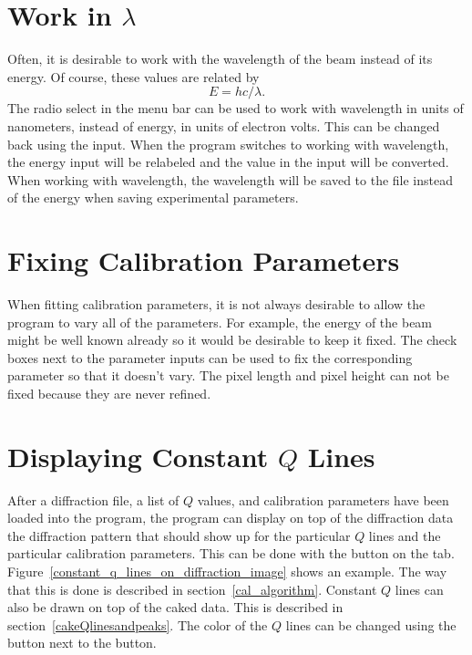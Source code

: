 \section{\texorpdfstring{Work in 
    $\lambda$}{Work in Lambda}}
    \label{workWavelength}

Often, it is desirable to work with the wavelength 
of the beam instead of its energy. Of course, these
values are related by
\begin{equation}
    E=hc/\lambda.
\end{equation}
The  radio select in the menu bar
can be used to work with wavelength in units of nanometers, 
instead of energy, in units of electron volts. 
This can be changed back using the  input.
When the program switches to working with wavelength,
the energy input  will be relabeled
\gui{$\lambda$} and the value in the input will be converted.
When working with wavelength, the 
wavelength will be saved to the file instead of the energy when
saving experimental parameters.

\section{Fixing Calibration Parameters}
\label{fix_parameters}

When fitting calibration parameters, it is not
always desirable to allow the program to vary
all of the parameters. For example,
the energy of the beam might be well known already
so it would be desirable to keep it fixed.
The  check boxes next to the parameter
inputs can be used to fix the corresponding parameter
so that it doesn't vary.
The pixel length and pixel height can not be fixed 
because they are never refined. 

\section{\texorpdfstring{Displaying Constant $Q$ 
    Lines}{Displaying Constant Q Lines}}
    \label{displayconstQlines}

After a diffraction file, a list of $Q$ values,
and calibration parameters have been loaded into
the program, the program can display on top of
the diffraction data the diffraction pattern that should
show up for the particular $Q$ lines and the
particular calibration parameters.
This can be done with the  button on the 
 tab. 
Figure~\ref{constant_q_lines_on_diffraction_image}
shows an example. The way that this is done is
described in section~\ref{cal_algorithm}.
Constant $Q$ lines can also be drawn on top of the
caked data. This is described in 
section~\ref{cakeQlinesandpeaks}.  The color of the 
$Q$ lines can be changed using the
 button next to the  
button.

